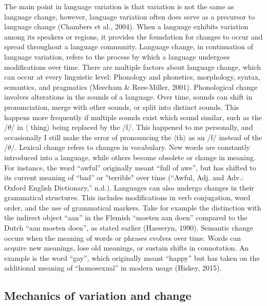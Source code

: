 The main point in language variation is that variation is not the same as language change, however, language variation often does serve as a precursor to language change (Chambers et al., 2004). When a language exhibits variation among its speakers or regions, it provides the foundation for changes to occur and spread throughout a language community. Language change, in continuation of language variation, refers to the process by which a language undergoes modifications over time. There are multiple factors about language change, which can occur at every linguistic level: Phonology and phonetics, morphology, syntax, semantics, and pragmatics (Meecham \& Rees-Miller, 2001). Phonological change involves alterations in the sounds of a language. Over time, sounds can shift in pronunciation, merge with other sounds, or split into distinct sounds. This happens more frequently if multiple sounds exist which sound similar, such as the /$\theta$/ in $\langle$ thing$\rangle$ being replaced by the /f/. This happened to me personally, and occasionally I still make the error of pronouncing the $\langle$th$\rangle$ as an /f/ instead of the /$\theta$/. Lexical change refers to changes in vocabulary. New words are constantly introduced into a language, while others become obsolete or change in meaning. For instance, the word “awful” originally meant “full of awe”, but has shifted to its current meaning of “bad” or "terrible" over time (“Awful, Adj. and Adv.: Oxford English Dictionary,” n.d.). Languages can also undergo changes in their grammatical structures. This includes modifications in verb conjugation, word order, and the use of grammatical markers. Take for example the distinction with the indirect object “aan” in the Flemish “moeten aan doen” compared to the Dutch “aan moeten doen”, as stated earlier (Haeseryn, 1990). Semantic change occurs when the meaning of words or phrases evolves over time. Words can acquire new meanings, lose old meanings, or sustain shifts in connotation. An example is the word “gay”, which originally meant “happy” but has taken on the additional meaning of “homosexual” in modern usage (Hiskey, 2015). 

\subsection{Mechanics of variation and change}

